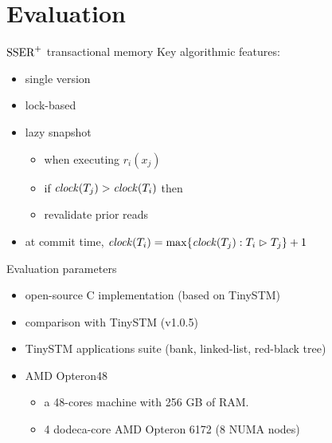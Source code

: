 \section{Evaluation}

\begin{frame}{$\SPSER$ transactional memory}
  Key algorithmic features:
  \begin{itemize}
  \item single version
  \item lock-based
  \item lazy snapshot
    \begin{itemize}
    \item[] when executing $r_i(x_j)$
    \item[] if $\clockOf{T_j} > \clockOf{T_i}$ then
    \item[] \hspace{1em} revalidate prior reads
    \end{itemize}        
  \item at commit time, $\clockOf{T_i} = \max \{ \clockOf{T_j} : T_i \depends T_j \} + 1$
  \end{itemize}
\end{frame}

\begin{frame}{Evaluation parameters}
  \begin{itemize}
  \item open-source C implementation (based on TinySTM)
  \item comparison with TinySTM (v1.0.5)
  \item TinySTM applications suite (bank, linked-list, red-black tree)
  \item AMD Opteron48
    \begin{itemize}
    \item a 48-cores machine with 256 GB of RAM.
    \item 4 dodeca-core AMD Opteron 6172 (8 NUMA nodes)
    \end{itemize}    
  \end{itemize}
\end{frame}


